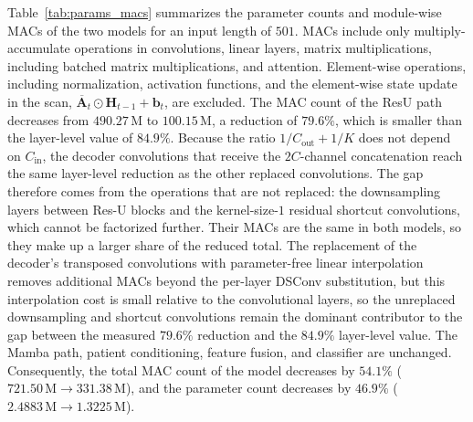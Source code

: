 Table~\ref{tab:params_macs} summarizes the parameter counts and module-wise MACs of the two models for an input length of $501$.
MACs include only multiply-accumulate operations in convolutions, linear layers, matrix multiplications, including batched matrix multiplications, and attention.
Element-wise operations, including normalization, activation functions, and the element-wise state update in the scan,
$\overline{\mathbf{A}}_t\odot\mathbf{H}_{t-1}+\mathbf{b}_t$,
are excluded.
The MAC count of the ResU path decreases from $490.27\,\mathrm{M}$ to $100.15\,\mathrm{M}$, a reduction of $79.6\%$, which is smaller than the layer-level value of $84.9\%$.
Because the ratio $1/C_{\mathrm{out}}+1/K$ does not depend on $C_{\mathrm{in}}$, the decoder convolutions that receive the $2C$-channel concatenation reach the same layer-level reduction as the other replaced convolutions.
The gap therefore comes from the operations that are not replaced: the downsampling layers between Res-U blocks and the kernel-size-$1$ residual shortcut convolutions, which cannot be factorized further.
Their MACs are the same in both models, so they make up a larger share of the reduced total.
The replacement of the decoder's transposed convolutions with parameter-free linear interpolation removes additional MACs beyond the per-layer DSConv substitution, but this interpolation cost is small relative to the convolutional layers, so the unreplaced downsampling and shortcut convolutions remain the dominant contributor to the gap between the measured $79.6\%$ reduction and the $84.9\%$ layer-level value.
The Mamba path, patient conditioning, feature fusion, and classifier are unchanged.
Consequently, the total MAC count of the model decreases by $54.1\%$ ($721.50\,\mathrm{M}\rightarrow331.38\,\mathrm{M}$), and the parameter count decreases by $46.9\%$ ($2.4883\,\mathrm{M}\rightarrow1.3225\,\mathrm{M}$).
 
